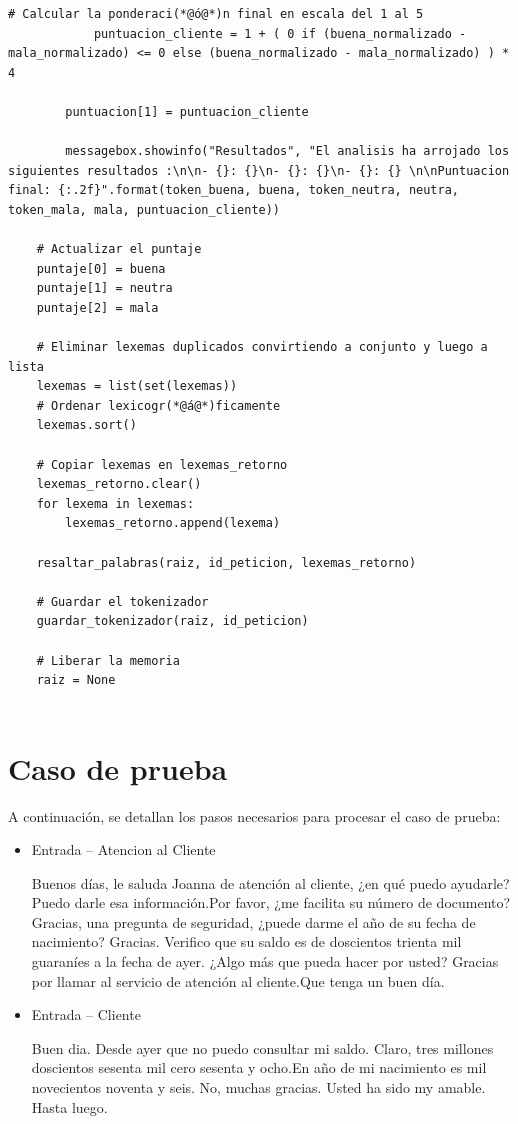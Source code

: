 \documentclass[10pt,times,twocolumn]{article}
\begin{document}
\begin{lstlisting}[caption={Core del análisis. Procesar}, xleftmargin=0.05\textwidth]
            # Calcular la ponderaci(*@ó@*)n final en escala del 1 al 5
            puntuacion_cliente = 1 + ( 0 if (buena_normalizado - mala_normalizado) <= 0 else (buena_normalizado - mala_normalizado) ) * 4
        
        puntuacion[1] = puntuacion_cliente
    
        messagebox.showinfo("Resultados", "El analisis ha arrojado los siguientes resultados :\n\n- {}: {}\n- {}: {}\n- {}: {} \n\nPuntuacion final: {:.2f}".format(token_buena, buena, token_neutra, neutra, token_mala, mala, puntuacion_cliente))
    
    # Actualizar el puntaje
    puntaje[0] = buena
    puntaje[1] = neutra
    puntaje[2] = mala

    # Eliminar lexemas duplicados convirtiendo a conjunto y luego a lista
    lexemas = list(set(lexemas))
    # Ordenar lexicogr(*@á@*)ficamente
    lexemas.sort()

    # Copiar lexemas en lexemas_retorno
    lexemas_retorno.clear()
    for lexema in lexemas:
        lexemas_retorno.append(lexema)

    resaltar_palabras(raiz, id_peticion, lexemas_retorno)

    # Guardar el tokenizador
    guardar_tokenizador(raiz, id_peticion)

    # Liberar la memoria
    raiz = None
            
\end{lstlisting}

\section{Caso de prueba}
A continuación, se detallan los pasos necesarios para procesar el caso de prueba:

\begin{itemize}

	\item Entrada – Atencion al Cliente
	
Buenos días, le saluda Joanna de atención al cliente, ¿en qué puedo ayudarle?
Puedo darle esa información.Por favor, ¿me facilita su número de documento?
Gracias, una pregunta de seguridad, ¿puede darme el año de su fecha de
nacimiento?
Gracias. Verifico que su saldo es de doscientos trienta mil guaraníes a la fecha de
ayer. ¿Algo más que pueda hacer por usted?
Gracias por llamar al servicio de atención al cliente.Que tenga un buen día.

	\item Entrada – Cliente
	
Buen dia. Desde ayer que no puedo consultar mi saldo.
Claro, tres millones doscientos sesenta mil cero sesenta y ocho.En año de mi nacimiento es mil novecientos noventa y seis.
No, muchas gracias. Usted ha sido my amable.
Hasta luego.

\end{itemize}
\end{document}
